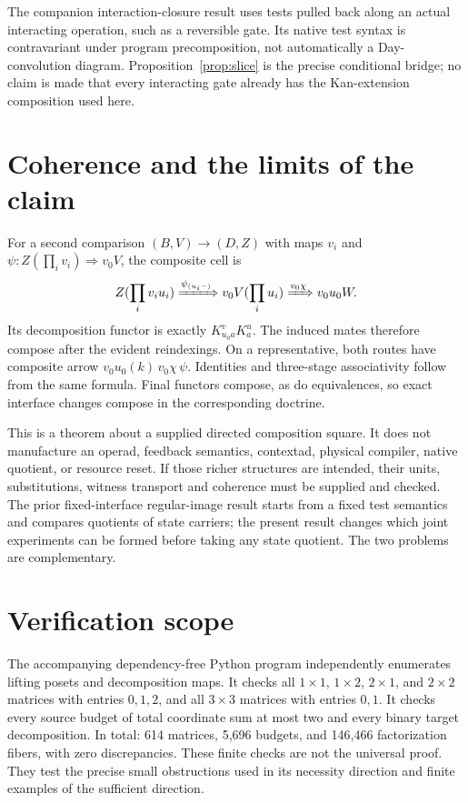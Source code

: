 \documentclass[11pt]{article}
\theoremstyle{definition}\newtheorem{definition}[theorem]{Definition}
\theoremstyle{remark}\newtheorem{remark}[theorem]{Remark}
\begin{document}
The companion interaction-closure result uses tests pulled back along an
actual interacting operation, such as a reversible gate. Its native test
syntax is contravariant under program precomposition, not automatically a
Day-convolution diagram. Proposition~\ref{prop:slice} is the precise
conditional bridge; no claim is made that every interacting gate already
has the Kan-extension composition used here.

\section{Coherence and the limits of the claim}
For a second comparison $(B,V)\to(D,Z)$ with maps $v_i$ and
$\psi:Z(\prod_i v_i)\Rightarrow v_0V$, the composite cell is
\[
 Z(\prod_i v_i u_i)
  \xRightarrow{\psi_{(u_i-)}}v_0V(\prod_i u_i)
  \xRightarrow{v_0\chi}v_0u_0W.
\]
Its decomposition functor is exactly
$K^v_{u_0a}K^u_a$. The induced mates therefore compose after the evident
reindexings. On a representative, both routes have composite arrow
$v_0u_0(k)\,v_0\chi\,\psi$. Identities and three-stage associativity
follow from the same formula. Final functors compose, as do equivalences,
so exact interface changes compose in the corresponding doctrine.

This is a theorem about a supplied directed composition square. It does
not manufacture an operad, feedback semantics, contextad, physical
compiler, native quotient, or resource reset. If those richer structures
are intended, their units, substitutions, witness transport and coherence
must be supplied and checked. The prior fixed-interface regular-image
result starts from a fixed test semantics and compares quotients of state
carriers; the present result changes which joint experiments can be formed
before taking any state quotient. The two problems are complementary.

\section{Verification scope}
The accompanying dependency-free Python program independently enumerates
lifting posets and decomposition maps. It checks all $1\times1$,
$1\times2$, $2\times1$, and $2\times2$ matrices with entries $0,1,2$,
and all $3\times3$ matrices with entries $0,1$. It checks every source
budget of total coordinate sum at most two and every binary target
decomposition. In total: 614 matrices, 5,696 budgets, and 146,466
factorization fibers, with zero discrepancies. These finite checks are
not the universal proof. They test the precise small obstructions used
in its necessity direction and finite examples of the sufficient direction.
\end{document}
